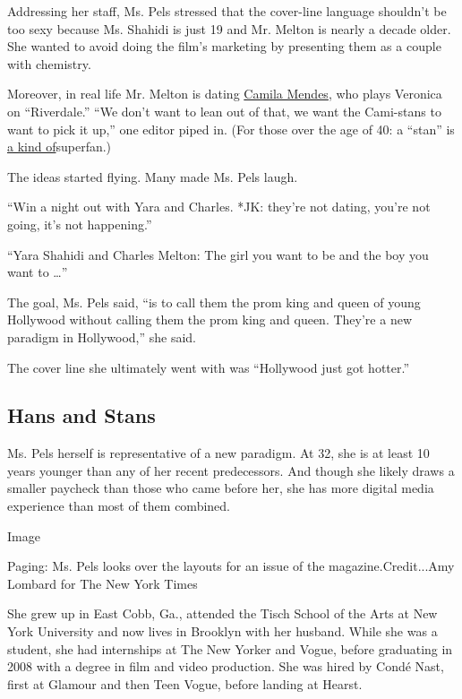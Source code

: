 Addressing her staff, Ms. Pels stressed that the cover-line language
shouldn't be too sexy because Ms. Shahidi is just 19 and Mr. Melton is
nearly a decade older. She wanted to avoid doing the film's marketing by
presenting them as a couple with chemistry.

Moreover, in real life Mr. Melton is dating
\href{https://www.instagram.com/camimendes/?hl=en}{Camila Mendes}, who
plays Veronica on ``Riverdale.'' ``We don't want to lean out of that, we
want the Cami-stans to want to pick it up,'' one editor piped in. (For
those over the age of 40: a ``stan'' is
\href{https://www.nytimes3xbfgragh.onion/2011/10/06/fashion/scratching-the-celebrity-itch.html}{a
kind of}superfan.)

The ideas started flying. Many made Ms. Pels laugh.

``Win a night out with Yara and Charles. *JK: they're not dating, you're
not going, it's not happening.''

``Yara Shahidi and Charles Melton: The girl you want to be and the boy
you want to \ldots{}''

The goal, Ms. Pels said, ``is to call them the prom king and queen of
young Hollywood without calling them the prom king and queen. They're a
new paradigm in Hollywood,'' she said.

The cover line she ultimately went with was ``Hollywood just got
hotter.''

\hypertarget{hans-and-stans}{%
\subsection{Hans and Stans}\label{hans-and-stans}}

Ms. Pels herself is representative of a new paradigm. At 32, she is at
least 10 years younger than any of her recent predecessors. And though
she likely draws a smaller paycheck than those who came before her, she
has more digital media experience than most of them combined.

Image

Paging: Ms. Pels looks over the layouts for an issue of the
magazine.Credit...Amy Lombard for The New York Times

She grew up in East Cobb, Ga., attended the Tisch School of the Arts at
New York University and now lives in Brooklyn with her husband. While
she was a student, she had internships at The New Yorker and Vogue,
before graduating in 2008 with a degree in film and video production.
She was hired by Condé Nast, first at Glamour and then Teen Vogue,
before landing at Hearst.

